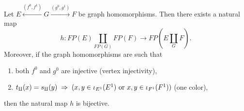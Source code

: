 \documentclass[10pt,a4paper]{amsart}
\def\text{\hbox}
\begin{document}
\begin{lemma}\label{answer}
Let $E\stackrel{(f^0,f^1)}{\longleftarrow} G\stackrel{(g^0,g^1)}{\longrightarrow} F$ 
be graph homomorphisms.
Then there exists a natural map
\begin{equation*}
h\colon FP(E)\underset{FP(G)}{\amalg}FP(F)\longrightarrow FP\left(E\underset{G}{\amalg}F\right).
\end{equation*}
Moreover,  if the graph homomorphisms are such that
\vspace*{-2mm}
\begin{enumerate}
\item
both $f^0$ and $g^0$ are injective (vertex injectivity),
\item
$t_\amalg(x)=s_\amalg(y)\;\Rightarrow\;(x,y\in\iota_{E^1}(E^1)\text{ or }x,y\in\iota_{F^1}(F^1))$
(one color),
\end{enumerate}
then the natural map $h$ is bijective.
\end{lemma}
\end{document}
